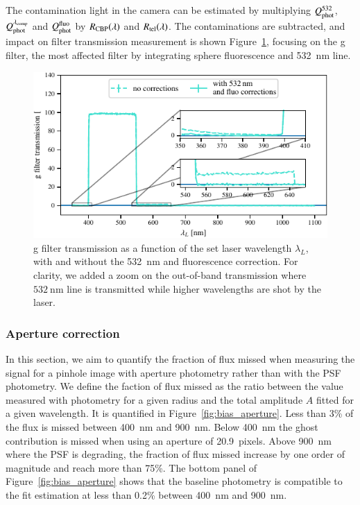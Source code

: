 The contamination light in the \SD camera can be estimated by multiplying $Q_{\mathrm{phot}}^{532}$, $Q_{\mathrm{phot}}^{\lambda_{\rm comp}}$ and $Q_{\mathrm{phot}}^{\mathrm{fluo}}$ by $R_{\mathrm{CBP}}(\lambda)$ and $R_{\mathrm{tel}}(\lambda)$. The contaminations are subtracted, and impact on filter transmission measurement is shown Figure~\ref{fig:g_filter_532}, focusing on the \SD g filter, the most affected filter by integrating sphere fluorescence and \SI{532}{\nano\meter} line.

\begin{figure}[h]
    \centering
    \includegraphics[width=\columnwidth]{fig/g_filter_532.pdf}
    \caption{\SD g filter transmission as a function of the set laser wavelength $\lambda_L$, with and without the \SI{532}{\nm} and fluorescence correction. For clarity, we added a zoom on the out-of-band transmission where $\SI{532}{\nm}$ line is transmitted while higher wavelengths are shot by the laser.}
    \label{fig:g_filter_532}
\end{figure}

\subsubsection{Aperture correction}

In this section, we aim to quantify the fraction of flux missed when measuring the signal for a \spinhole pinhole image with aperture photometry rather than with the PSF photometry. We define the faction of flux missed as the ratio between the value measured with photometry for a given radius and the total amplitude $A$ fitted for a given wavelength. It is quantified in Figure~\ref{fig:bias_aperture}. Less than 3\% of the flux is missed between \SI{400}{\nano\meter} and \SI{900}{\nano\meter}. Below \SI{400}{\nano\meter} the ghost contribution is missed when using an aperture of \SI{20.9}{pixels}. Above \SI{900}{\nano\meter} where the PSF is degrading, the fraction of flux missed increase by one order of magnitude and reach more than 75\%. The bottom panel of Figure~\ref{fig:bias_aperture} shows that the baseline photometry is compatible to the fit estimation at less than 0.2\% between \SI{400}{\nano\meter} and \SI{900}{\nano\meter}. 


